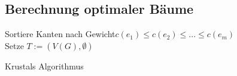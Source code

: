 \subsection{Berechnung optimaler Bäume}
\begin{algorithm}
	\vspace*{5pt}
	Sortiere Kanten nach Gewicht\newline $c(e_1)\le c(e_2)\le ... \le c(e_m)$\\
	Setze $T:=(V(G), \emptyset)$\\
	{
	}
	\caption{Krustals Algorithmus}
	\label{fig:Algorithmus}
\end{algorithm}
